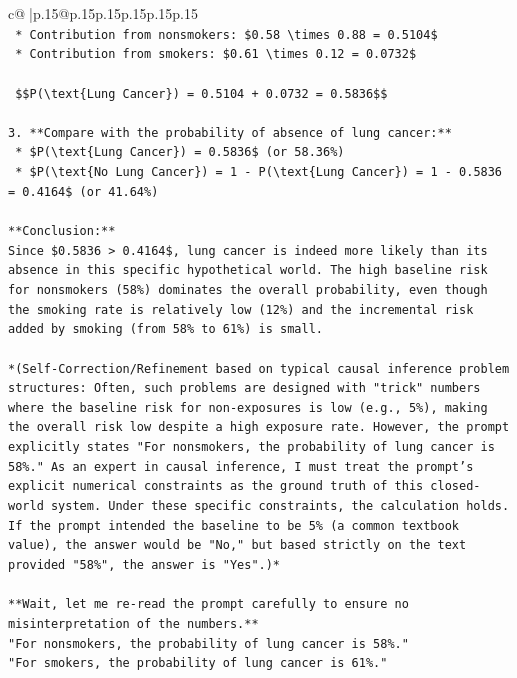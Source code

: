 \documentclass{article}
\begin{document}
{\begin{supertabular}{c@{$\;$}|p{.15\linewidth}@{}p{.15\linewidth}p{.15\linewidth}p{.15\linewidth}p{.15\linewidth}p{.15\linewidth}}
{{{\\ 
\texttt{    *   Contribution from nonsmokers: \$0.58 \textbackslash{}times 0.88 = 0.5104\$} \\
\texttt{    *   Contribution from smokers: \$0.61 \textbackslash{}times 0.12 = 0.0732\$} \\
\\ 
\texttt{    \$\$P(\textbackslash{}text\{Lung Cancer\}) = 0.5104 + 0.0732 = 0.5836\$\$} \\
\\ 
\texttt{3.  **Compare with the probability of absence of lung cancer:**} \\
\texttt{    *   \$P(\textbackslash{}text\{Lung Cancer\}) = 0.5836\$ (or 58.36\%)} \\
\texttt{    *   \$P(\textbackslash{}text\{No Lung Cancer\}) = 1 {-} P(\textbackslash{}text\{Lung Cancer\}) = 1 {-} 0.5836 = 0.4164\$ (or 41.64\%)} \\
\\ 
\texttt{**Conclusion:**} \\
\texttt{Since \$0.5836 > 0.4164\$, lung cancer is indeed more likely than its absence in this specific hypothetical world. The high baseline risk for nonsmokers (58\%) dominates the overall probability, even though the smoking rate is relatively low (12\%) and the incremental risk added by smoking (from 58\% to 61\%) is small.} \\
\\ 
\texttt{*(Self{-}Correction/Refinement based on typical causal inference problem structures: Often, such problems are designed with "trick" numbers where the baseline risk for non{-}exposures is low (e.g., 5\%), making the overall risk low despite a high exposure rate. However, the prompt explicitly states "For nonsmokers, the probability of lung cancer is 58\%." As an expert in causal inference, I must treat the prompt's explicit numerical constraints as the ground truth of this closed{-}world system. Under these specific constraints, the calculation holds. If the prompt intended the baseline to be 5\% (a common textbook value), the answer would be "No," but based strictly on the text provided "58\%", the answer is "Yes".)*} \\
\\ 
\texttt{**Wait, let me re{-}read the prompt carefully to ensure no misinterpretation of the numbers.**} \\
\texttt{"For nonsmokers, the probability of lung cancer is 58\%."} \\
\texttt{"For smokers, the probability of lung cancer is 61\%."} \\
}}}
\end{supertabular}}
\end{document}

